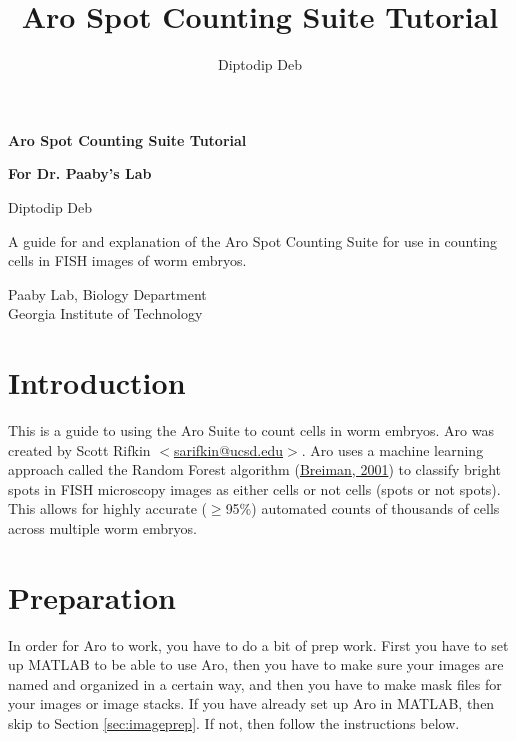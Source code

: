 \documentclass[titlepage,11pt]{article}
\begin{document}
\title{Aro Spot Counting Suite Tutorial}
\author{Diptodip Deb}
\begin{titlepage}
\begin{center}
\vspace*{1cm}
\huge
\textbf{Aro Spot Counting Suite Tutorial}

\vspace{0.5cm}
\Large
\textbf{For Dr. Paaby's Lab}

\vspace{1.5cm}

Diptodip Deb

\vfill

A guide for and explanation of the Aro Spot Counting Suite for use in counting cells in FISH images of worm embryos.

\vspace{0.8cm}

\large
Paaby Lab, Biology Department\\
Georgia Institute of Technology\\
\date{}

\end{center}
\end{titlepage}
\tableofcontents
\pagebreak

\section{Introduction}

This is a guide to using the Aro Suite to count cells in worm embryos. Aro was created by Scott Rifkin $<$\href{mailto:sarifkin@ucsd.edu}{sarifkin@ucsd.edu}$>$. Aro uses a machine learning approach called the Random Forest algorithm (\href{http://link.springer.com/article/10.1023\%2FA\%3A1010933404324}{Breiman, 2001}) to classify bright spots in FISH microscopy images as either cells or not cells (spots or not spots). This allows for highly accurate ($\geq$95\%) automated counts of thousands of cells across multiple worm embryos.

\section{Preparation}

In order for Aro to work, you have to do a bit of prep work. First you have to set up MATLAB to be able to use Aro, then you have to make sure your images are named and organized in a certain way, and then you have to make mask files for your images or image stacks. If you have already set up Aro in MATLAB, then skip to Section \ref{sec:imageprep}. If not, then follow the instructions below.
\end{document}
